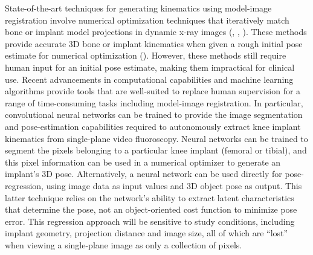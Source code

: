 State-of-the-art techniques for generating kinematics using model-image registration involve numerical optimization techniques that iteratively match bone or implant model projections in dynamic x-ray images (\cite{postolkaEvaluationIntensitybasedAlgorithm2020}, \cite{floodAutomatedRegistration3D2018}, \cite{tsaiVolumetricModelbased2D2010}). These methods provide accurate 3D bone or implant kinematics when given a rough initial pose estimate for numerical optimization (\cite{floodAutomatedRegistration3D2018}). However, these methods still require human input for an initial pose estimate, making them impractical for clinical use. 
Recent advancements in computational capabilities and machine learning algorithms provide tools that are well-suited to replace human supervision for a range of time-consuming tasks including model-image registration. In particular, convolutional neural networks can be trained to provide the image segmentation and pose-estimation capabilities required to autonomously extract knee implant kinematics from single-plane video fluoroscopy. Neural networks can be trained to segment the pixels belonging to a particular knee implant (femoral or tibial), and this pixel information can be used in a numerical optimizer to generate an implant's 3D pose. Alternatively, a neural network can be used directly for pose-regression, using image data as input values and 3D object pose as output. This latter technique relies on the network's ability to extract latent characteristics that determine the pose, not an object-oriented cost function to minimize pose error. This regression approach will be sensitive to study conditions, including implant geometry, projection distance and image size, all of which are ``lost'' when viewing a single-plane image as only a collection of pixels. 

